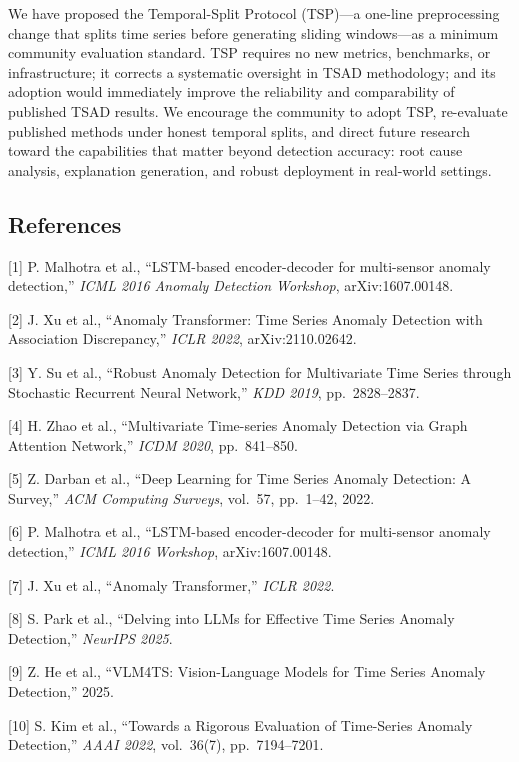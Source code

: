 \documentclass[
]{article}
\begin{document}
We have proposed the Temporal-Split Protocol (TSP)---a one-line
preprocessing change that splits time series before generating sliding
windows---as a minimum community evaluation standard. TSP requires no
new metrics, benchmarks, or infrastructure; it corrects a systematic
oversight in TSAD methodology; and its adoption would immediately
improve the reliability and comparability of published TSAD results. We
encourage the community to adopt TSP, re-evaluate published methods
under honest temporal splits, and direct future research toward the
capabilities that matter beyond detection accuracy: root cause analysis,
explanation generation, and robust deployment in real-world settings.

\subsection{References}\label{references}

{[}1{]} P. Malhotra et al., ``LSTM-based encoder-decoder for
multi-sensor anomaly detection,'' \emph{ICML 2016 Anomaly Detection
Workshop}, arXiv:1607.00148.

{[}2{]} J. Xu et al., ``Anomaly Transformer: Time Series Anomaly
Detection with Association Discrepancy,'' \emph{ICLR 2022},
arXiv:2110.02642.

{[}3{]} Y. Su et al., ``Robust Anomaly Detection for Multivariate Time
Series through Stochastic Recurrent Neural Network,'' \emph{KDD 2019},
pp.~2828--2837.

{[}4{]} H. Zhao et al., ``Multivariate Time-series Anomaly Detection via
Graph Attention Network,'' \emph{ICDM 2020}, pp.~841--850.

{[}5{]} Z. Darban et al., ``Deep Learning for Time Series Anomaly
Detection: A Survey,'' \emph{ACM Computing Surveys}, vol.~57, pp.~1--42,
2022.

{[}6{]} P. Malhotra et al., ``LSTM-based encoder-decoder for
multi-sensor anomaly detection,'' \emph{ICML 2016 Workshop},
arXiv:1607.00148.

{[}7{]} J. Xu et al., ``Anomaly Transformer,'' \emph{ICLR 2022}.

{[}8{]} S. Park et al., ``Delving into LLMs for Effective Time Series
Anomaly Detection,'' \emph{NeurIPS 2025}.

{[}9{]} Z. He et al., ``VLM4TS: Vision-Language Models for Time Series
Anomaly Detection,'' 2025.

{[}10{]} S. Kim et al., ``Towards a Rigorous Evaluation of Time-Series
Anomaly Detection,'' \emph{AAAI 2022}, vol.~36(7), pp.~7194--7201.
\end{document}

